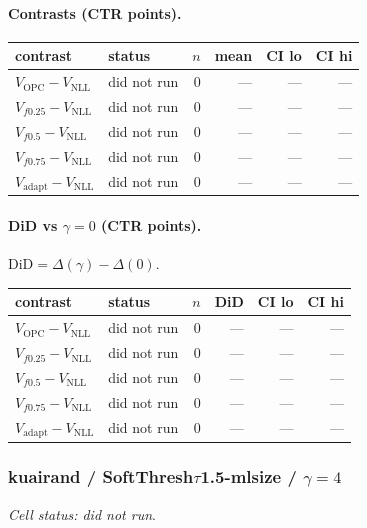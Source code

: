 \documentclass[10pt,a4paper]{article}
\begin{document}
\paragraph{Contrasts (CTR points).}
{\centering\small\begin{tabular}{llrrrr}
\toprule contrast & status & $n$ & mean & CI lo & CI hi \\
\midrule
$V_{\mathrm{OPC}}-V_{\mathrm{NLL}}$ & did not run & 0 & --- & --- & --- \\
$V_{f0.25}-V_{\mathrm{NLL}}$ & did not run & 0 & --- & --- & --- \\
$V_{f0.5}-V_{\mathrm{NLL}}$ & did not run & 0 & --- & --- & --- \\
$V_{f0.75}-V_{\mathrm{NLL}}$ & did not run & 0 & --- & --- & --- \\
$V_{\mathrm{adapt}}-V_{\mathrm{NLL}}$ & did not run & 0 & --- & --- & --- \\
\bottomrule\end{tabular}\par}
\paragraph{DiD vs $\gamma=0$ (CTR points).} $\mathrm{DiD}=\Delta(\gamma)-\Delta(0)$.
{\centering\small\begin{tabular}{llrrrr}
\toprule contrast & status & $n$ & DiD & CI lo & CI hi \\
\midrule
$V_{\mathrm{OPC}}-V_{\mathrm{NLL}}$ & did not run & 0 & --- & --- & --- \\
$V_{f0.25}-V_{\mathrm{NLL}}$ & did not run & 0 & --- & --- & --- \\
$V_{f0.5}-V_{\mathrm{NLL}}$ & did not run & 0 & --- & --- & --- \\
$V_{f0.75}-V_{\mathrm{NLL}}$ & did not run & 0 & --- & --- & --- \\
$V_{\mathrm{adapt}}-V_{\mathrm{NLL}}$ & did not run & 0 & --- & --- & --- \\
\bottomrule\end{tabular}\par}
\bigskip
\subsubsection{kuairand / SoftThresh$\tau$1.5-mlsize / $\gamma=4$}
\emph{Cell status: did not run}.
\end{document}
